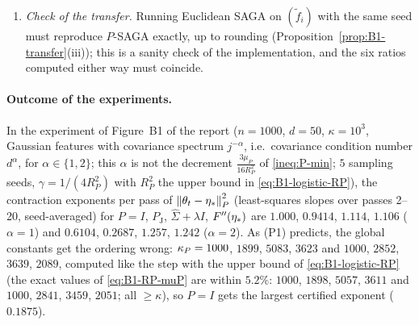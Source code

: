 \begin{enumerate}[label=(P\arabic*)]
parameter share of $V^P$: $r_{\mathrm{min}}$ always lies within $\frac1{3n}$ of $1$, tends to $1$ iff $V^P$ is
dominated by the parameter term, and the min step costs
$-n\log r_{\mathrm{min}}\approx(1-s)\big(\frac13-\frac{3n}{16\kappaP}\big)$ in the exponent per pass. If the memory
errors $z_i^{(t-1)}-\fip(\etastar)\approx H_i\delta'$ were built from a single past error $\delta'$ aligned with
$\delta$, one would get $r_{\mathrm{var}}\approx1-\muEff^P/\LEff^P$ (close to $1$ when the effective condition
number is large, hence smaller under preconditioning) and a negative correlation of $a_{t,i}$ and $b_{t,i}$,
i.e.\ $r_{\mathrm{sq}}\le\frac12$, since
$r_{\mathrm{sq}}=\frac12+\sum_ia_{t,i}^\top P^{-1}b_{t,i}\big/\sum_i\big(\norm{a_{t,i}}_{P^{-1}}^2+\norm{b_{t,i}}_{P^{-1}}^2\big)$.
Exactly, $r_{\mathrm{init}}=r_{\mathrm{coco}}(1)\,\muEff^P(\theta_0)/R_P^2$ by \eqref{eq:B1-rinit-identity}, which is
expected to increase under preconditioning.
\item \emph{Check of the transfer.} Running Euclidean SAGA on $(\tilde f_i)$ with the same seed must
reproduce $P$-SAGA exactly, up to rounding (Proposition~\ref{prop:B1-transfer}(iii)); this is a sanity
check of the implementation, and the six ratios computed either way must coincide.
\end{enumerate}

\paragraph{Outcome of the experiments.}
In the experiment of Figure~B1 of the report ($n=1000$, $d=50$, $\kappa=10^3$, Gaussian features with
covariance spectrum $j^{-\alpha}$, i.e.\ covariance condition number $d^\alpha$, for $\alpha\in\{1,2\}$; this
$\alpha$ is not the decrement $\frac{3\mu_P}{16R_P^2}$ of \eqref{ineq:P-min}; $5$ sampling seeds,
$\gamma=1/(4R_P^2)$ with $R_P^2$ the upper bound in \eqref{eq:B1-logistic-RP}), the contraction exponents per
pass of $\left\|\theta_t-\eta_\ast\right\|_P^2$ (least-squares slopes over passes 2--20, seed-averaged) for $P=I$,
$P_{\mathrm J}$, $\hat\Sigma+\lambda I$, $F''(\eta_\ast)$ are $1.000$, $0.9414$, $1.114$, $1.106$ ($\alpha=1$) and
$0.6104$, $0.2687$, $1.257$, $1.242$ ($\alpha=2$). As (P1) predicts, the global constants get the ordering
wrong: $\kappa_P=1000$, $1899$, $5083$, $3623$ and $1000$, $2852$, $3639$, $2089$, computed like the step with the
upper bound of \eqref{eq:B1-logistic-RP} (the exact values of \eqref{eq:B1-RP-muP} are within $5.2\%$: $1000$,
$1898$, $5057$, $3611$ and $1000$, $2841$, $3459$, $2051$; all $\ge\kappa$), so $P=I$ gets the largest certified
exponent ($0.1875$).

